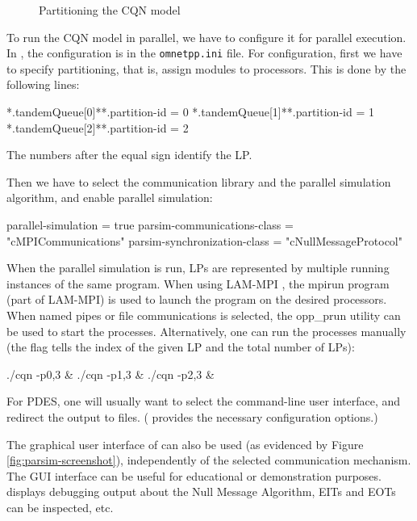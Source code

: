 \begin{figure}[htbp]
  \begin{center}
    
    \caption{Partitioning the CQN model}
    \label{fig:cqn-partitioning}
  \end{center}
\end{figure}

To run the CQN model in parallel, we have to configure it for parallel
execution. In {\opp}, the configuration is in the
\texttt{omnetpp.ini} file. For configuration, first we have to specify
partitioning, that is, assign modules to processors. This is done
by the following lines:

\begin{inifile}
[General]
*.tandemQueue[0]**.partition-id = 0
*.tandemQueue[1]**.partition-id = 1
*.tandemQueue[2]**.partition-id = 2
\end{inifile}

The numbers after the equal sign identify the LP.

Then we have to select the communication library and the parallel
simulation algorithm, and enable parallel simulation:

\begin{inifile}
[General]
parallel-simulation = true
parsim-communications-class = "cMPICommunications"
parsim-synchronization-class = "cNullMessageProtocol"
\end{inifile}

When the parallel simulation is run, LPs are represented
by multiple running instances of the same program.
When using LAM-MPI \cite{lammpi}, the mpirun program (part of LAM-MPI)
is used to launch the program on the desired processors.
When named pipes or file communications is selected, the opp\_prun
{\opp} utility can be used to start the processes.
Alternatively, one can run the processes manually (the  flag
tells {\opp} the index of the given LP and the total number of LPs):

\begin{commandline}
./cqn -p0,3 &
./cqn -p1,3 &
./cqn -p2,3 &
\end{commandline}

For PDES, one will usually want to select the command-line user interface,
and redirect the output to files. ({\opp} provides the necessary
configuration options.)

The graphical user interface of {\opp} can also be used
(as evidenced by Figure \ref{fig:parsim-screenshot}),
independently of the selected communication mechanism.
The GUI interface can be useful for educational or demonstration purposes.
{\opp} displays debugging output about the Null Message Algorithm,
EITs and EOTs can be inspected, etc.



